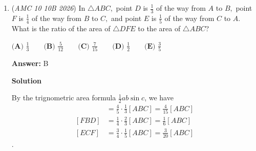 \begin{enumerate}
 This is impossible, so there are no solutions in this case.

 $\textbf{Case 2:}$ Suppose that $x-y\geq 0$ and $x-y-4\leq 0$. Then

 
 \[0\leq x-y\leq 4.\]

 Therefore, the intersection is defined by the inequalities

 
 \[-4\leq x+y\leq 4\]

 and

 
 \[0\leq x-y\leq 4.\]

 The first pair of inequalities is bounded by the lines $x+y=-4$ and $x+y=4$, while the second pair is bounded by the lines $x-y=0$ and $x-y=4$.

 Graphing these four boundary lines, we have a rectangle with vertices $(2,2)$, $(4,0)$, $(0,-4)$, and $(-2,-2)$.

 The side lengths of this rectangle are $2\sqrt{2}$ and $4\sqrt{2}$, which can be calculated using the distance formula (or the Pythagorean theorem). We know that the figure is a rectangle because the slopes of adjacent sides are $-1$ and $1$, whose product is $-1$. Therefore, adjacent sides are perpendicular.

 Thus, the area of the intersection is
 \[2\sqrt{2}\cdot 4\sqrt{2}=16.\]

 \[\boxed{\text{E}}\]



	\item (\textit{AMC 10 10B 2026}) In $\triangle ABC,$ point $D$ is $\frac{1}{3}$ of the way from $A$ to $B,$ point $F$ is $\frac{1}{4}$ of the way from $B$ to $C,$ and point $E$ is $\frac{1}{5}$ of the way from $C$ to $A.$ What is the ratio of the area of $\triangle DFE$ to the area of $\triangle ABC$?


 $\textbf{(A) } \frac{1}{3} \qquad \textbf{(B) } \frac{5}{12} \qquad \textbf{(C) } \frac{7}{15} \qquad \textbf{(D) } \frac{1}{2} \qquad \textbf{(E) } \frac{3}{5}$

 \textbf{Answer: }B



\textbf{Solution}

By the trignometric area formula $\frac{1}{2}ab\sin c$, we have
 \begin{align*} [AED] &= \frac{4}{5} \cdot \frac{1}{3}[ABC] = \frac{4}{15}[ABC] \\ [FBD] &= \frac{1}{4} \cdot \frac{2}{3}[ABC] = \frac{1}{6}[ABC] \\ [ECF] &= \frac{3}{4} \cdot \frac{1}{5}[ABC] = \frac{3}{20}[ABC] \end{align*}
.


\end{enumerate}
